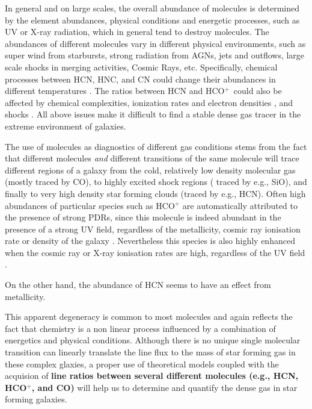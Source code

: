 \documentclass[legal,11pt]{article}
\def\HCOP       {HCO$^{+}$}
\begin{document}
In general and on large scales, the overall abundance of molecules is
determined by the element abundances, physical conditions and
energetic processes, such as UV or X-ray radiation,  which in general tend to
destroy molecules.  The abundances of different molecules vary in different
physical environments, such as super wind from starbursts, strong radiation
from AGNs, jets and outflows, large scale shocks in merging activities, Cosmic
Rays, etc. Specifically, chemical processes between HCN, HNC, and CN could
change their abundances in different temperatures \citep{Baan08}. The ratios
between HCN and \HCOP\ could also be affected by chemical
complexities\citep[e.g.,][]{krips08}, ionization rates and electron densities
\citep[e.g.][]{PPP2007}, and shocks \citep[e.g.,][]{Xie95}. All above issues
make it difficult to find a stable dense gas tracer in the extreme environment
of galaxies. 

The use of molecules as diagnostics of different gas conditions stems from the
fact that different molecules {\it and} different transitions of the same
molecule will trace different regions of a galaxy from the cold, relatively low
density molecular gas (mostly traced by CO), to highly excited shock regions ( 
traced by e.g., SiO), and finally to very high density star forming clouds (traced by
e.g., HCN). Often high abundances of particular species such as HCO$^+$ are
automatically attributed to the presence of strong PDRs, since this molecule is
indeed abundant in the presence of a strong UV field, regardless of the
metallicity, cosmic ray ionisation rate or density of the galaxy
\citep[e.g.,][]{Bayet2011}. Nevertheless this species is also highly enhanced
when the cosmic ray or X-ray ionisation rates are high, regardless of the UV
field \citep[e.g.,][]{Bayet2011,Meijerink2005,Meijerink07}. 


On the other hand, the abundance of HCN seems to have an effect from metallicity. 

This apparent degeneracy is common to most molecules and again reflects the
fact that chemistry is a non linear process influenced by a combination of
energetics and physical conditions. Although there is no unique single
molecular transition can linearly translate the line flux to the mass of star
forming gas in these complex glaxies, a proper use of theoretical models
coupled with the acquision of {\bf line ratios between several different
molecules (e.g., HCN, \HCOP, and CO) } will help us to determine and quantify
the dense gas in star forming galaxies. 
\end{document}
